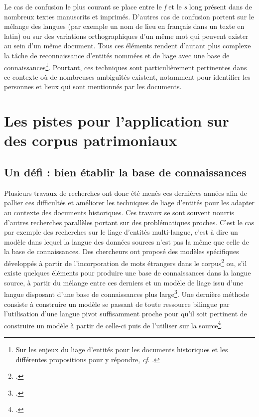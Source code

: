 \documentclass[a4paper,12pt,twoside]{book}
\begin{document}
	Le cas de confusion le plus courant se place entre le \textit{f} et le \textit{s} long présent dans de nombreux textes manuscrits et imprimés. D'autres cas de confusion portent sur le mélange des langues (par exemple un nom de lieu en français dans un texte en latin) ou sur des variations orthographiques d'un même mot qui peuvent exister au sein d'un même document. Tous ces éléments rendent d'autant plus complexe la tâche de reconnaissance d'entités nommées et de liage avec une base de connaissances\footnote{Sur les enjeux du liage d'entités pour les documents historiques et les différentes propositions pour y répondre, \textit{cf}. \cite{pontes_entity_2020}.}. Pourtant, ces techniques sont particulièrement pertinentes dans ce contexte où de nombreuses ambiguïtés existent, notamment pour identifier les personnes et lieux qui sont mentionnés par les documents.
	
	\section{Les pistes pour l'application sur des corpus patrimoniaux}
	
	\subsection{Un défi : bien établir la base de connaissances}
	
	Plusieurs travaux de recherches ont donc été menés ces dernières années afin de pallier ces difficultés et améliorer les techniques de liage d'entités pour les adapter au contexte des documents historiques. Ces travaux se sont souvent nourris d'autres recherches parallèles portant sur des problématiques proches. C'est le cas par exemple des recherches sur le liage d'entités multi-langue, c'est à dire un modèle dans lequel la langue des données sources n'est pas la même que celle de la base de connaissances. Des chercheurs ont proposé des modèles spécifiques développés à partir de l'incorporation de mots étrangers dans le corpus\footcite{linhares_pontes_linking_2020} ou, s'il existe quelques éléments pour produire une base de connaissances dans la langue source, à partir du mélange entre ces derniers et un modèle de liage issu d'une langue disposant d'une base de connaissances plus large\footcite{zhou_towards_2019}. Une dernière méthode consiste à construire un modèle se passant de toute ressource bilingue par l'utilisation d'une langue pivot suffisamment proche pour qu'il soit pertinent de construire un modèle à partir de celle-ci puis de l'utiliser sur la source\footcite{rijhwani_zero-shot_2019}.
	
\end{document}
